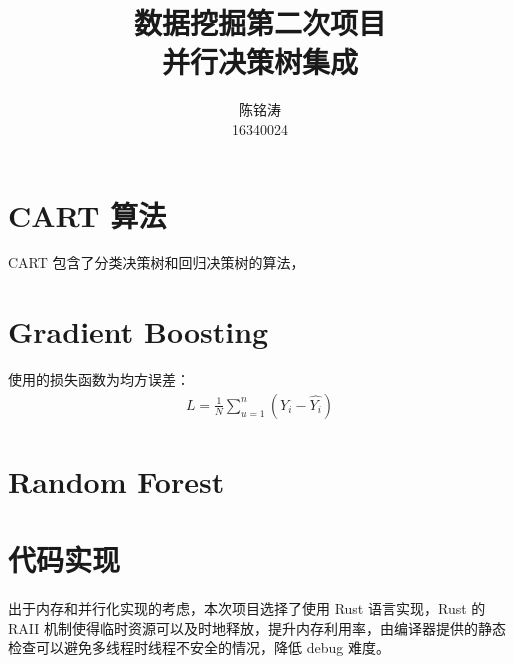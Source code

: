 \documentclass[12pt]{article}
\begin{document}
\author{陈铭涛\\16340024}
\title{数据挖掘第二次项目\\
    \large{并行决策树集成}}
\maketitle

\medskip


\section{CART 算法}

CART 包含了分类决策树和回归决策树的算法，

\section{Gradient Boosting}

使用的损失函数为均方误差：
\begin{equation}
    \begin{aligned}
    L= \frac{1}{N}\sum_{u=1}^{n}(Y_i - \hat{Y_i})
    \end{aligned}
\end{equation}

\section{Random Forest}

\section{代码实现}
\paragraph{}

出于内存和并行化实现的考虑，本次项目选择了使用 Rust 语言实现，Rust 的 RAII 机制使得临时资源可以及时地释放，提升内存利用率，由编译器提供的静态检查可以避免多线程时线程不安全的情况，降低 debug 难度。
\end{document}
